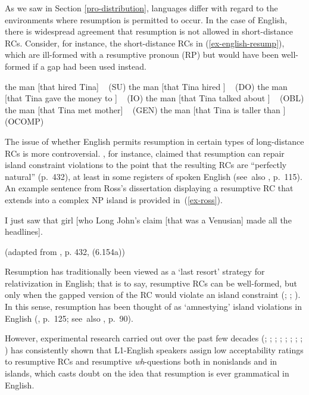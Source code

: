 As we saw in Section \ref{pro-distribution}, languages differ with regard to the environments where resumption is permitted to occur. In the case of English, there is widespread agreement that resumption is not allowed in short-distance RCs. Consider, for instance, the short-distance RCs in (\ref{ex-english-resump}), which are ill-formed with a resumptive pronoun (RP) but would have been well-formed if a gap had been used instead.

\pex\label{ex-english-resump} 
\a \ljudge*the man [that  hired Tina] ~ (SU)
\a \ljudge*the man [that Tina hired ] ~ (DO)
\a \ljudge*the man [that Tina gave the money to ] ~ (IO)
\a \ljudge*the man [that Tina talked about ] ~ (OBL)
\a \ljudge*the man [that Tina met  mother] ~ (GEN)
\a \ljudge*the man [that Tina is taller than ] ~ (OCOMP)
\xe 

\noindent The issue of whether English permits resumption in certain types of long-distance RCs is more controversial. \textcite{ross1967}, for instance, claimed that resumption can repair island constraint violations to the point that the resulting RCs are ``perfectly natural'' (p.~432), at least in some registers of spoken English (see~also \cite{kayne1981}, p.~115). An example sentence from Ross's dissertation displaying a resumptive RC that extends into a complex NP island is provided in~(\ref{ex-ross}).

\begin{samepage}
\ex\label{ex-ross}I just saw that girl [who Long John's claim [that  was a Venusian] made all the headlines].\par\nobreak\vspace{5pt}
\hfill (adapted from \cite{ross1967}, p. 432, (6.154a))
\xe 
\end{samepage}

\noindent Resumption has traditionally been viewed as a `last resort' strategy for relativization in English; that is to say, resumptive RCs can be well-formed, but only when the gapped version of the RC would violate an island constraint (\cite{chomsky1995}; \cite{ross1967}; \cite{shlonsky1992}). In this sense, resumption has been thought of as `amnestying' island violations in English (\cite{kroch1981}, p.~125; see~also \cite{erteschik-shir1992}, p.~90).

However, experimental research carried out over the past few decades  (\cite{alexopoulou.keller2007}; \cite{beltrama.xiang2016}; \cite{han.etal2012}; \cite{heestand.etal2011}; \cite{keffala2011}; \cite{keffala.goodall2011}; \cite{mcdaniel.cowart1999}; \cite{omaki.nakao2010}; \cite{polinsky.etal2013}) has consistently shown that L1-English speakers assign low acceptability ratings to resumptive RCs and resumptive \textit{wh}-questions both in nonislands and in islands, which casts doubt on the idea that resumption is ever grammatical in English.

